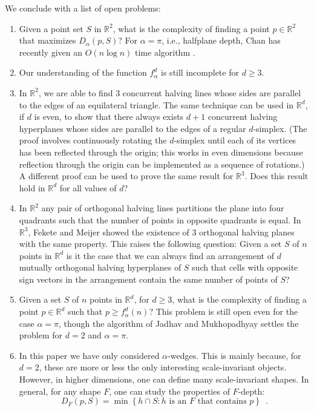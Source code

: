 \documentclass{dmtcs}
\newcommand{\R}{\mathbb{R}}
\begin{document}
We conclude with a list of open problems:

\begin{enumerate}
\item Given a point set $S$ in $\R^2$, what is the complexity
of finding a point $p\in\R^2$ that maximizes $D_\alpha(p,S)$?
For $\alpha=\pi$, i.e., halfplane depth, Chan has recently given an
$O(n\log n)$ time algorithm \cite{c04}.

\item Our understanding of the function $f^d_\alpha$ is still
incomplete for $d\ge 3$.

\item In $\R^2$, we are able to find 3 concurrent halving
lines whose sides are parallel to the edges of an equilateral
triangle.  The same technique can be used in $\R^d$, if $d$ is
even, to show that there always exists $d+1$ concurrent halving
hyperplanes whose sides are parallel to the edges of a regular
$d$-simplex. (The proof involves continuously rotating the
$d$-simplex until each of its vertices has been reflected through the
origin; this works in even dimensions because reflection through the
origin can be implemented as a sequence of rotations.)
A different proof can be used to prove the same result for
$\R^3$.  Does this result hold in $\R^d$ for all
values of $d$?

\item In $\R^2$ any pair of orthogonal halving lines partitions
the plane into four quadrants such that the number of points in
opposite quadrants is equal. In $\R^3$, Fekete and Meijer
\cite{fm00} showed the existence of 3 orthogonal halving planes with the same
property.  This raises the following question: Given a set $S$ of $n$
points in $\R^d$ is it the case that we can always find an
arrangement of $d$ mutually orthogonal halving hyperplanes of $S$ such
that cells with opposite sign vectors in the arrangement contain the
same number of points of $S$?

\item Given a set $S$ of $n$ points in $\R^d$, for $d\ge 3$,
what is the complexity of finding a point $p\in \R^d$ such
that $p\ge f_\alpha^d(n)$?  This problem is still open even for the
case $\alpha=\pi$, though the algorithm of Jadhav and Mukhopadhyay
\cite{jm94} settles the problem for $d=2$ and $\alpha=\pi$. 

\item In this paper we have only considered $\alpha$-wedges.  This is
mainly because, for $d=2$, these are more or less the only interesting
scale-invariant objects.  However, in higher dimensions, one can
define many scale-invariant shapes.  In general, for any shape $F$,
one can study the properties of $F$-depth:
\[
  D_F(p,S) = \min\left\{ 
     h\cap S : \mbox{$h$ is an $F$ that contains $p$}
  \right\} \enspace .
\] 
\end{enumerate}
\end{document}
